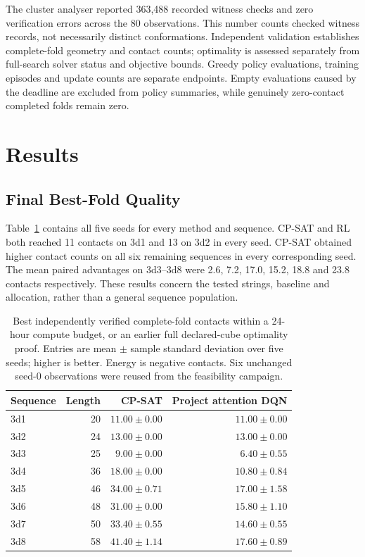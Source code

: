 \documentclass{article}
\theoremstyle{plain}
\theoremstyle{definition}
\begin{document}
The cluster analyser reported 363,488 recorded witness checks and zero verification errors across the 80 observations. This number counts checked witness records, not necessarily distinct conformations. Independent validation establishes complete-fold geometry and contact counts; optimality is assessed separately from full-search solver status and objective bounds. Greedy policy evaluations, training episodes and update counts are separate endpoints. Empty evaluations caused by the deadline are excluded from policy summaries, while genuinely zero-contact completed folds remain zero.

\section{Results}\label{sec:results}
\subsection{Final Best-Fold Quality}
Table~\ref{tab:cpu_results} contains all five seeds for every method and sequence. CP-SAT and RL both reached 11 contacts on 3d1 and 13 on 3d2 in every seed. CP-SAT obtained higher contact counts on all six remaining sequences in every corresponding seed. The mean paired advantages on 3d3--3d8 were 2.6, 7.2, 17.0, 15.2, 18.8 and 23.8 contacts respectively. These results concern the tested strings, baseline and allocation, rather than a general sequence population.

\begin{table}[htbp]
\centering
\caption{Best independently verified complete-fold contacts within a 24-hour compute budget, or an earlier full declared-cube optimality proof. Entries are mean $\pm$ sample standard deviation over five seeds; higher is better. Energy is negative contacts. Six unchanged seed-0 observations were reused from the feasibility campaign.}\label{tab:cpu_results}
\begin{tabular}{lrrr}
\toprule
Sequence & Length & CP-SAT & Project attention DQN \\
\midrule
3d1 & 20 & $11.00\pm0.00$ & $11.00\pm0.00$ \\
3d2 & 24 & $13.00\pm0.00$ & $13.00\pm0.00$ \\
3d3 & 25 & $9.00\pm0.00$ & $6.40\pm0.55$ \\
3d4 & 36 & $18.00\pm0.00$ & $10.80\pm0.84$ \\
3d5 & 46 & $34.00\pm0.71$ & $17.00\pm1.58$ \\
3d6 & 48 & $31.00\pm0.00$ & $15.80\pm1.10$ \\
3d7 & 50 & $33.40\pm0.55$ & $14.60\pm0.55$ \\
3d8 & 58 & $41.40\pm1.14$ & $17.60\pm0.89$ \\
\bottomrule
\end{tabular}
\end{table}
\end{document}
